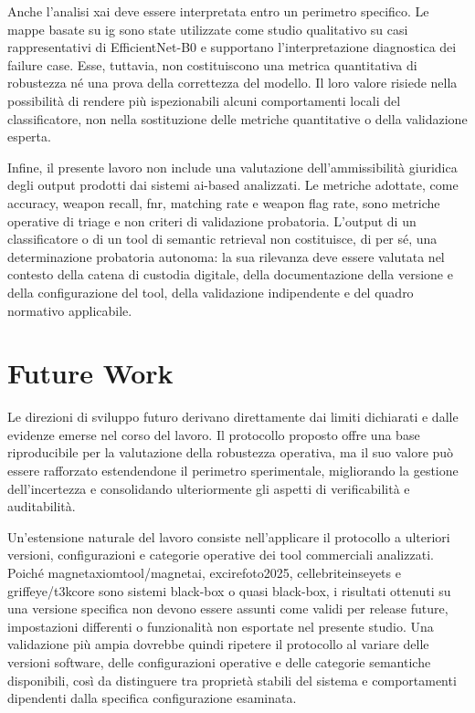 Anche l'analisi \gls{xai} deve essere interpretata entro un perimetro
specifico. Le mappe basate su \gls{ig} sono state utilizzate come studio
qualitativo su casi rappresentativi di EfficientNet-B0 e supportano
l'interpretazione diagnostica dei failure case. Esse, tuttavia, non
costituiscono una metrica quantitativa di robustezza né una prova della
correttezza del modello. Il loro valore risiede nella possibilità di rendere più
ispezionabili alcuni comportamenti locali del classificatore, non nella
sostituzione delle metriche quantitative o della validazione esperta.

Infine, il presente lavoro non include una valutazione dell'ammissibilità
giuridica degli output prodotti dai sistemi \gls{ai}-based analizzati. Le
metriche adottate, come accuracy, weapon recall, \gls{fnr}, matching rate e
weapon flag rate, sono metriche operative di triage e non criteri di validazione
probatoria. L'output di un classificatore o di un tool di semantic retrieval non
costituisce, di per sé, una determinazione probatoria autonoma: la sua rilevanza
deve essere valutata nel contesto della catena di custodia digitale, della
documentazione della versione e della configurazione del tool, della validazione
indipendente e del quadro normativo applicabile.


\section{Future Work}
\label{sec:conclusions-future-work}

Le direzioni di sviluppo futuro derivano direttamente dai limiti dichiarati e
dalle evidenze emerse nel corso del lavoro. Il protocollo proposto offre una
base riproducibile per la valutazione della robustezza operativa, ma il suo
valore può essere rafforzato estendendone il perimetro sperimentale, migliorando
la gestione dell'incertezza e consolidando ulteriormente gli aspetti di
verificabilità e auditabilità.

Un'estensione naturale del lavoro consiste nell'applicare il protocollo a
ulteriori versioni, configurazioni e categorie operative dei tool commerciali
analizzati. Poiché \gls{magnetaxiomtool}/\gls{magnetai}, \gls{excirefoto2025},
\gls{cellebriteinseyets} e \gls{griffeye}/\gls{t3kcore} sono sistemi black-box o
quasi black-box, i risultati ottenuti su una versione specifica non devono essere
assunti come validi per release future, impostazioni differenti o funzionalità
non esportate nel presente studio. Una validazione più ampia dovrebbe quindi
ripetere il protocollo al variare delle versioni software, delle configurazioni
operative e delle categorie semantiche disponibili, così da distinguere tra
proprietà stabili del sistema e comportamenti dipendenti dalla specifica
configurazione esaminata.


